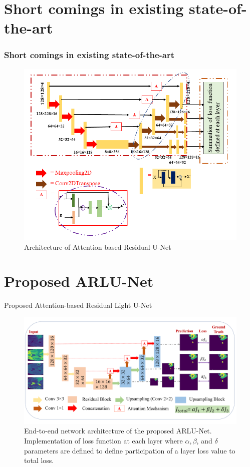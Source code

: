 \documentclass [xcolor=svgnames, t] {beamer}
\begin{document}
\section{Short comings in existing state-of-the-art}
\begin{frame}\frametitle{Short comings in existing state-of-the-art}
\begin{figure}[ht!]
\includegraphics[width=0.7\linewidth]{baseline model.png}
\caption{Architecture of Attention based Residual U-Net\cite{MAJI2022103077}}
\centering
\end{figure}
\end{frame}

\section{Proposed ARLU-Net}
\begin{frame}{Proposed Attention-based Residual Light U-Net}
\begin{figure}[H]
\centering
\includegraphics[width=1\linewidth]{model.png}
\caption{\justifying End-to-end network architecture of the proposed ARLU-Net. Implementation of loss function at each layer where $\alpha, \beta$, and $\delta$ parameters are defined to define participation of a layer loss value to total loss.}
\end{figure}
\end{frame}
\end{document}
